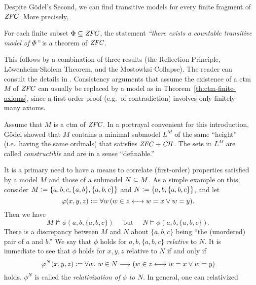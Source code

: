 Despite G\"odel's Second, we can find transitive models for every
finite fragment of $\mathit{ZFC}$. More precisely, 
%
\begin{theorem}\label{th:ctm-finite-axioms}
  For each finite subset
  $\Phi\subseteq \mathit{ZFC}$, the statement \emph{``there exists a countable
  transitive model of $\Phi$''} is a theorem of $\mathit{ZFC}$.
\end{theorem}
%
This follows by a
combination of three results (the Reflection Principle,
L\"owenheim-Skolem Theorem, and the Mostowksi Collapse). The reader
can consult the details in \cite{kunen2011set}. Consistency arguments that assume
the existence of a ctm $M$ of $\mathit{ZFC}$ can usually be replaced by a
model as in Theorem~\ref{th:ctm-finite-axioms}, since a first-order
proof (e.g.\ of contradiction) involves only finitely many axioms.

Assume that $M$ is a ctm of $\mathit{ZFC}$. In a portrayal convenient for this
introduction, G\"odel showed that $M$ contains a minimal submodel
$L^M$ of the same ``height'' (i.e.\ having the same ordinals)
that satisfies $\mathit{ZFC}+\mathit{CH}$. The sets in $L^M$ are called
\emph{constructible} and are in a sense ``definable.''

It is a primary need to have a means to correlate  (first-order)
properties satisfied by a model $M$ and those of a 
submodel $N\subseteq M$. As a simple example on this, consider 
$M\mathrel{\mathop:}= \{a,b,c, \{a,b\},\{a,b,c\}\}$ and
$N\mathrel{\mathop:}=\{a,b,\{a,b,c\}\}$, and let 
\[
\varphi(x,y,z)\mathrel{\mathop:}= \forall w \,( w\in z \longleftrightarrow w=x \vee w=y).
\]
Then we have
\[
M\not\models \phi(a,b,\{a,b,c\}) \quad\text{ but }\quad N\models \phi(a,b,\{a,b,c\}).
\]
There is a discrepancy between  $M$ and $N$ about $\{a,b,c\}$ being ``the
(unordered) pair of $a$ and $b$.'' We say that $\phi$ holds for
$a,b,\{a,b,c\}$ \emph{relative} to $N$. It is immediate to see that
$\phi$ holds  for $x,y,z$ relative to $N$ if and only if
\[
\varphi^N(x,y,z)\mathrel{\mathop:}= \forall w.\ w\in N\longrightarrow ( w\in z \longleftrightarrow w=x \vee w=y)
\] 
holds. $\phi^N$ is called the \emph{relativization of $\phi$ to
  $N$}. In general, one can relativized

